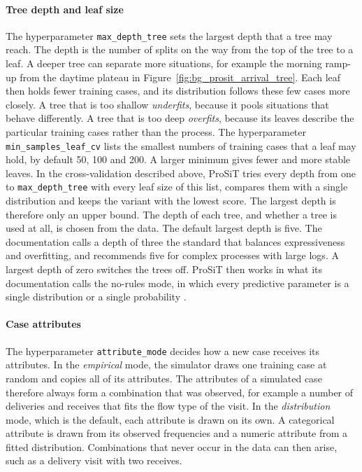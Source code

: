 \paragraph{Tree depth and leaf size}
The hyperparameter \texttt{max\_depth\_tree} sets the largest depth that a tree
may reach. The depth is the number of splits on the way from the top of the tree
to a leaf. A deeper tree can separate more situations, for example the morning
ramp-up from the daytime plateau in Figure~\ref{fig:bg_prosit_arrival_tree}. Each
leaf then holds fewer training cases, and its distribution follows these few
cases more closely. A tree that is too shallow \emph{underfits}, because it pools
situations that behave differently. A tree that is too deep \emph{overfits},
because its leaves describe the particular training cases rather than the process.
The hyperparameter \texttt{min\_samples\_leaf\_cv} lists the smallest numbers of
training cases that a leaf may hold, by default 50, 100 and 200. A larger minimum
gives fewer and more stable leaves. In the cross-validation described above,
ProSiT tries every depth from one to \texttt{max\_depth\_tree} with every leaf
size of this list, compares them with a single distribution and keeps the variant
with the lowest score. The largest depth is therefore only an upper bound. The
depth of each tree, and whether a tree is used at all, is chosen from the data.
The default largest depth is five. The documentation calls a depth of three the
standard that balances expressiveness and overfitting, and recommends five for
complex processes with large logs. A largest depth of zero switches the trees off.
ProSiT then works in what its documentation calls the no-rules mode, in which every
predictive parameter is a single distribution or a single probability
\cite{ProSiTDocs}.

\paragraph{Case attributes}
The hyperparameter \texttt{attribute\_mode} decides how a new case receives its
attributes. In the \emph{empirical} mode, the simulator draws one training case at
random and copies all of its attributes. The attributes of a simulated case
therefore always form a combination that was observed, for example a number of
deliveries and receives that fits the flow type of the visit. In the
\emph{distribution} mode, which is the default, each attribute is drawn on its
own. A categorical attribute is drawn from its observed frequencies and a numeric
attribute from a fitted distribution. Combinations that never occur in the data
can then arise, such as a delivery visit with two receives.


